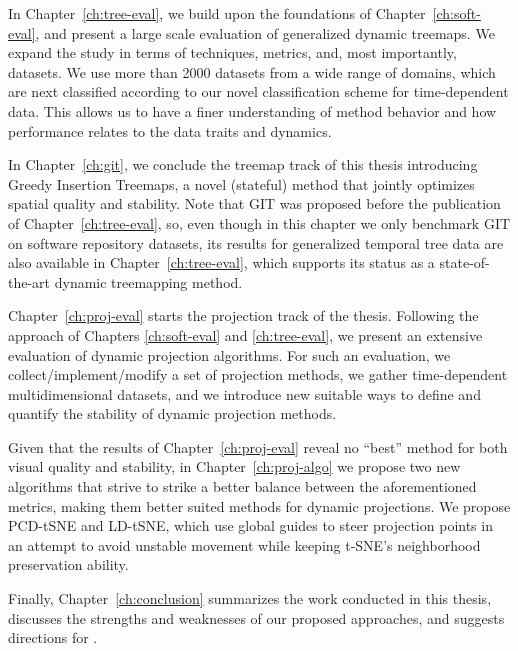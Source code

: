 In Chapter~\ref{ch:tree-eval}, we build upon the foundations of Chapter~\ref{ch:soft-eval}, and present a large scale evaluation of generalized dynamic treemaps. We expand the study in terms of techniques, metrics, and, most importantly, datasets. We use more than 2000 datasets from a wide range of domains, which are next classified according to our novel classification scheme for time-dependent data. This allows us to have a finer understanding of method behavior and how performance relates to the data traits and dynamics. 

In Chapter~\ref{ch:git}, we conclude the treemap track of this thesis introducing Greedy Insertion Treemaps, a novel (stateful) method that jointly optimizes spatial quality and stability. Note that GIT was proposed before the publication of Chapter~\ref{ch:tree-eval}, so, even though in this chapter we only benchmark GIT on software repository datasets, its results for generalized temporal tree data are also available in Chapter~\ref{ch:tree-eval}, which supports its status as a state-of-the-art dynamic treemapping method. 

Chapter~\ref{ch:proj-eval} starts the projection track of the thesis. Following the approach of Chapters \ref{ch:soft-eval} and \ref{ch:tree-eval}, we present an extensive evaluation of dynamic projection algorithms. For such an evaluation, we collect/implement/modify a set of projection methods, we gather time-dependent multidimensional datasets, and we introduce new suitable ways to define and quantify the stability of dynamic projection methods.

Given that the results of Chapter~\ref{ch:proj-eval} reveal no ``best'' method for both visual quality and stability, in Chapter~\ref{ch:proj-algo} we propose two new algorithms that strive to strike a better balance between the aforementioned metrics, making them better suited methods for dynamic projections. 
We propose PCD-tSNE and LD-tSNE, which use global guides to steer projection points in an attempt to avoid unstable movement while keeping t-SNE’s neighborhood preservation ability. 


Finally, Chapter~\ref{ch:conclusion} summarizes the work conducted in this thesis, discusses the strengths and weaknesses of our proposed approaches, and suggests directions for .



